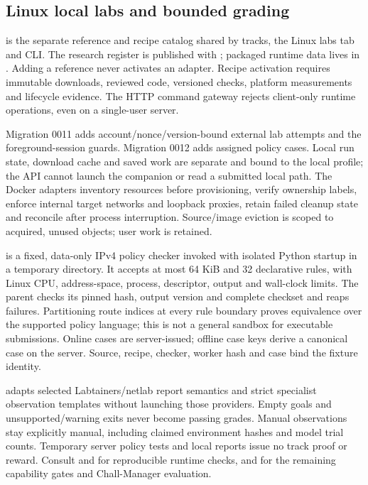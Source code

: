 \subsection{Linux local labs and bounded grading}
 is the separate reference and recipe catalog
shared by tracks, the Linux labs tab and CLI. The research register is published
with ; packaged runtime data lives in
. Adding a reference never activates an adapter.
Recipe activation requires immutable downloads, reviewed code, versioned checks,
platform measurements and lifecycle evidence. The HTTP command gateway rejects
client-only runtime operations, even on a single-user server.

Migration 0011 adds account/nonce/version-bound external lab attempts and the
foreground-session guards. Migration 0012 adds assigned policy cases. Local run
state, download cache and saved work are separate and bound to the local profile;
the API cannot launch the companion or read a submitted local path. The Docker
adapters inventory resources before provisioning, verify ownership labels,
enforce internal target networks and loopback proxies, retain failed cleanup
state and reconcile after process interruption. Source/image eviction is scoped
to acquired, unused objects; user work is retained.

 is a fixed, data-only IPv4 policy
checker invoked with isolated Python startup in a temporary directory. It
accepts at most 64 KiB and 32 declarative rules, with Linux CPU, address-space,
process, descriptor, output and wall-clock limits. The parent checks its pinned
hash, output version and complete checkset and reaps failures. Partitioning route
indices at every rule boundary proves equivalence over the supported policy
language; this is not a general sandbox for executable submissions. Online cases
are server-issued; offline case keys derive a canonical case on the server.
Source, recipe, checker, worker hash and case bind the fixture identity.

 adapts selected Labtainers/netlab report
semantics and strict specialist observation templates without launching those
providers. Empty goals and unsupported/warning exits never become passing
grades. Manual observations stay explicitly manual, including claimed environment
hashes and model trial counts. Temporary server policy tests and local reports
issue no track proof or reward. Consult
 and 
for reproducible runtime checks, and  for the remaining capability
gates and Chall-Manager evaluation.

